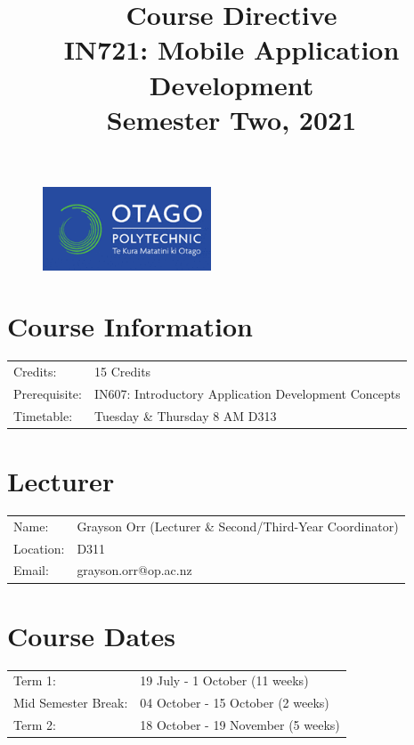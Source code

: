 \documentclass{article}
\author{}
\begin{document}
 

\begin{figure}
	\includegraphics[width=50mm]{../../resources/img/logo.png}
\end{figure} 

\title{Course Directive\\IN721: Mobile Application Development\\Semester Two, 2021}
\date{}
\maketitle 

\section*{Course Information}
\begin{tabular}{ll}
	Credits:                      & 15 Credits                                                                   \\
	Prerequisite:                 & IN607: Introductory Application Development Concepts \\
	Timetable:  & Tuesday \& Thursday 8 AM D313                                                         \\
\end{tabular}

\section*{Lecturer}
\begin{tabular}{ll}
	Name:     & Grayson Orr (Lecturer \& Second/Third-Year Coordinator) \\
	Location: & D311                   \\
	Email:    & grayson.orr@op.ac.nz   \\
\end{tabular}

\section*{Course Dates}
\begin{tabular}{ll}
	Term 1:             & 19 July - 1 October (11 weeks) \\
	Mid Semester Break: & 04 October - 15 October (2 weeks)    \\
	Term 2:             & 18 October - 19 November (5 weeks)        \\     
\end{tabular}
\end{document}
